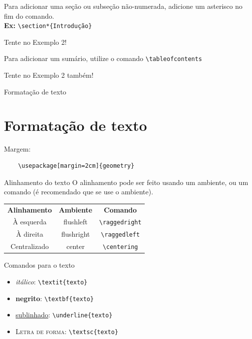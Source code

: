 \documentclass[12pt]{beamer}
\begin{document}
\begin{frame}[fragile]
  Para adicionar uma seção ou subseção não-numerada, adicione um asterisco no fim do comando.\\
  \medskip
  \textbf{Ex:} \verb+\section*{Introdução}+
  \medskip

  Tente no Exemplo 2!
\end{frame}

\begin{frame}[fragile]
  Para adicionar um sumário, utilize o comando \verb+\tableofcontents+
  \bigskip

  Tente no Exemplo 2 também!
\end{frame}

\begin{frame}[fragile]{Formatação de texto}
  \section{Formatação de texto}

  Margem:\\
  \begin{verbatim}
    \usepackage[margin=2cm]{geometry}
  \end{verbatim}
\end{frame}

\begin{frame}[fragile]{Alinhamento do texto}
  O alinhamento pode ser feito usando um ambiente, ou um comando (é recomendado que se use o ambiente).
  \begin{center}
    \begin{tabular}{ccc}
    \textbf{Alinhamento} & \textbf{Ambiente} & \textbf{Comando}\\
    À esquerda & flushleft & \verb+\raggedright+\\
    À direita & flushright & \verb+\raggedleft+\\
    Centralizado & center & \verb+\centering+\\
    \end{tabular}
  \end{center}
\end{frame}

\begin{frame}[fragile]{Comandos para o texto}
  \begin{itemize}
    \item \textit{itálico}: \verb+\textit{texto}+
    \item \textbf{negrito}: \verb+\textbf{texto}+
    \item \underline{sublinhado}: \verb+\underline{texto}+
    \item \textsc{Letra de forma}: \verb+\textsc{texto}+
  \end{itemize}
\end{frame}
\end{document}
